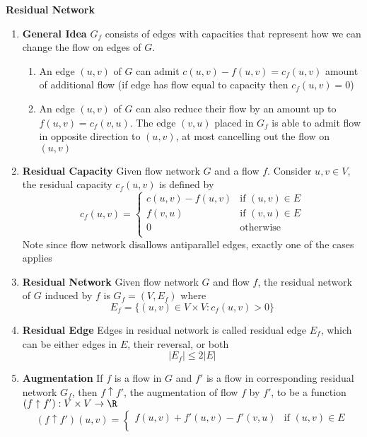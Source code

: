 \documentclass[11pt]{article}
\begin{document}
\begin{defn*}
    \textbf{Residual Network}
    \begin{enumerate}
        \item \textbf{General Idea} $G_f$ consists of edges with capacities that represent how we can change the flow on edges of $G$. 
        \begin{enumerate}
            \item An edge $(u,v)$ of $G$ can admit $c(u,v) - f(u,v) = c_f(u,v)$ amount of additional flow (if edge has flow equal to capacity then $c_f(u,v) = 0$)
            \item An edge $(u,v)$ of $G$ can also reduce their flow by an amount up to $f(u,v) = c_f(v,u)$. The edge $(v,u)$ placed in $G_f$ is able to admit flow in opposite direction to $(u,v)$, at most cancelling out the flow on $(u,v)$
        \end{enumerate}
        \item \textbf{Residual Capacity} Given flow network $G$ and a flow $f$. Consider $u,v\in V$, the residual capacity $c_f(u,v)$ is defined by 
        \[
            c_f(u,v) = 
            \begin{cases}
                c(u,v) - f(u,v) & \text{if } (u,v) \in E    \\
                f(v,u) & \text{if } (v,u) \in E             \\
                0 & \text{otherwise}\\
            \end{cases}
        \]
        Note since flow network disallows antiparallel edges, exactly one of the cases applies
        \item \textbf{Residual Network} Given flow network $G$ and flow $f$, the residual network of $G$ induced by $f$ is $G_f = (V, E_f)$ where 
        \[
            E_f = \{ (u,v)\in V\times V : c_f(u,v) > 0 \}
        \]
        \item \textbf{Residual Edge} Edges in residual network is called residual edge $E_f$, which can be either edges in $E$, their reversal, or both 
        \[
            |E_f| \leq 2|E|
        \]
        \item \textbf{Augmentation} If $f$ is a flow in $G$ and $f'$ is a flow in corresponding residual network $G_f$, then $f \uparrow f'$, the augmentation of flow $f$ by $f'$, to be a function $(f \uparrow f'): V\times V\to \R$
        \[
            (f \uparrow f')(u,v) = 
            \begin{cases}
                f(u,v) + f'(u,v) - f'(v,u) & \text{if } (u,v) \in E\\

\end{cases}\]
\end{enumerate}
\end{defn*}
\end{document}
